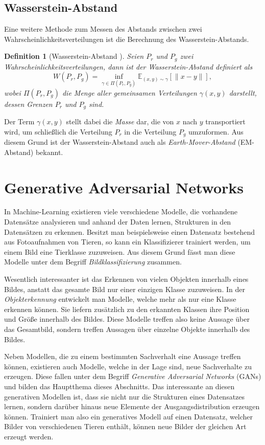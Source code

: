 \documentclass{hsflensburg}
\newtheorem{definition}{Definition}
\begin{document}
  \section{Wasserstein-Abstand}
  Eine weitere Methode zum Messen des Abstands zwischen zwei
  Wahrscheinlichkeitsverteilungen ist die Berechnung des Wasserstein-Abstands.

  \begin{definition}[Wasserstein-Abstand \cite{arjovsky2017wasserstein}]
    Seien $P_r$ und $P_g$ zwei Wahrscheinlichkeitsverteilungen, dann ist der
    Wasserstein-Abstand definiert als
    \[
      W(P_r, P_g) = \inf_{\gamma \in \Pi(P_r, P_g)} \mathbb{E}_{(x, y) \sim \gamma} \left[\|x - y\|\right],
    \]
    wobei $\Pi(P_r, P_g)$ die Menge aller gemeinsamen Verteilungen $\gamma(x,
    y)$ darstellt, dessen Grenzen $P_r$ und $P_g$ sind.
  \end{definition}

  Der Term $\gamma(x, y)$ stellt dabei die \textit{Masse} dar, die von $x$ nach
  $y$ transportiert wird, um schließlich die Verteilung $P_r$ in die Verteilung
  $P_g$ umzuformen. Aus diesem Grund ist der Wasserstein-Abstand auch als
  \textit{Earth-Mover-Abstand} (EM-Abstand) bekannt.

  \chapter{Generative Adversarial Networks}
  In Machine-Learning existieren viele verschiedene Modelle, die vorhandene
  Datensätze analysieren und anhand der Daten lernen, Strukturen in den
  Datensätzen zu erkennen.  Besitzt man beispielsweise einen Datensatz
  bestehend aus Fotoaufnahmen von Tieren, so kann ein Klassifizierer trainiert
  werden, um einem Bild eine Tierklasse zuzuweisen. Aus diesem Grund fässt man
  diese Modelle unter dem Begriff \textit{Bildklassifizierung} zusammen.

  Wesentlich interessanter ist das Erkennen von vielen Objekten innerhalb eines
  Bildes, anstatt das gesamte Bild nur einer einzigen Klasse zuzuweisen. In der
  \textit{Objekterkennung} entwickelt man Modelle, welche mehr als nur eine
  Klasse erkennen können. Sie liefern zusätzlich zu den erkannten Klassen ihre
  Position und Größe innerhalb des Bildes. Diese Modelle treffen also keine
  Aussage über das Gesamtbild, sondern treffen Aussagen über einzelne Objekte
  innerhalb des Bildes.

  Neben Modellen, die zu einem bestimmten Sachverhalt eine Aussage treffen
  können, existieren auch Modelle, welche in der Lage sind, neue Sachverhalte zu
  erzeugen. Diese fallen unter dem Begriff \textit{Generative Adversarial
  Networks} (GANs) und bilden das Hauptthema dieses Abschnitts. Das interessante
  an diesen generativen Modellen ist, dass sie nicht nur die Strukturen eines
  Datensatzes lernen, sondern darüber hinaus neue Elemente der
  Ausgangsdistribution erzeugen können. Trainiert man also ein generatives
  Modell auf einen Datensatz, welcher Bilder von verschiedenen Tieren enthält,
  können neue Bilder der gleichen Art erzeugt werden.
  
\end{document}
